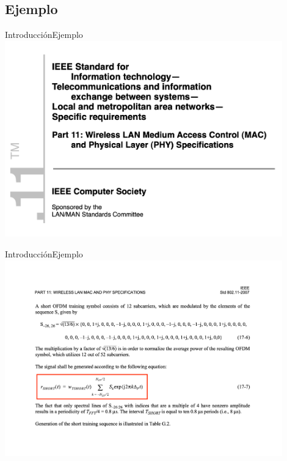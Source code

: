 \documentclass[10pt,compress]{beamer} %
\begin{document}

\subsection{Ejemplo}
\begin{frame}{Introducción}{Ejemplo}
  \centering \includegraphics[width=0.9\textwidth]{./Figuras/Wifi1.pdf}
\end{frame}

\begin{frame}{Introducción}{Ejemplo}
  \centering \includegraphics[width=0.9\textwidth]{./Figuras/Wifi2.pdf}
\end{frame}
\end{document}

